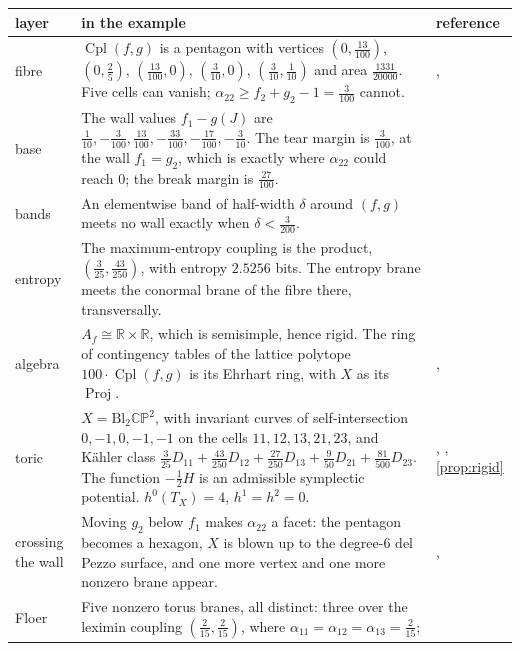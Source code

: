 \documentclass[11pt]{article}
\theoremstyle{definition}
\theoremstyle{remark}
\newcommand{\R}{\mathbb{R}}
\newcommand{\Cpl}{\operatorname{Cpl}}
\newcommand{\CP}{\mathbb{CP}}
\begin{document}
\begin{center}
\small
\begin{longtable}{p{2.6cm}p{8.3cm}p{3.8cm}}
\toprule
layer & in the example & reference\\
\midrule
\endhead
fibre & $\Cpl(f,g)$ is a pentagon with vertices $(0,\frac{13}{100})$, $(0,\frac25)$, $(\frac{13}{100},0)$, $(\frac3{10},0)$, $(\frac3{10},\frac1{10})$ and area
$\frac{1331}{20000}$. Five cells can vanish; $\alpha_{22}\ge f_2+g_2-1=\frac3{100}$ cannot. & \cite[\S6]{Conditionals}, \cite[Prop.~8.1]{Bridges}\\
base & The wall values $f_1-g(J)$ are $\frac1{10},-\frac3{100},\frac{13}{100},-\frac{33}{100},-\frac{17}{100},-\frac3{10}$. The tear margin is $\frac3{100}$, at the wall
$f_1=g_2$, which is exactly where $\alpha_{22}$ could reach $0$; the break margin is $\frac{27}{100}$. & \cite[Thm.~3.2]{Bands}\\
bands & An elementwise band of half-width $\delta$ around $(f,g)$ meets no wall exactly when $\delta<\frac3{200}$. & \cite[Prop.~3.4]{Bands}\\
entropy & The maximum-entropy coupling is the product, $(\frac3{25},\frac{43}{250})$, with entropy $2.5256$ bits. The entropy brane meets the
conormal brane of the fibre there, transversally. & \cite[Thm.~3.1]{Bridges}\\
algebra & $A_f\cong\R\times\R$, which is semisimple, hence rigid. The ring of contingency tables of the lattice polytope $100\cdot\Cpl(f,g)$ is its
Ehrhart ring, with $X$ as its $\operatorname{Proj}$. & \cite[Thms.~2.2, 7.1]{Algebras}, \cite[Prop.~7.1]{Bridges}\\
toric & $X=\mathrm{Bl}_2\CP^2$, with invariant curves of self-intersection $0,-1,0,-1,-1$ on the cells $11,12,13,21,23$, and Kähler class
$\frac3{25}D_{11}+\frac{43}{250}D_{12}+\frac{27}{250}D_{13}+\frac9{50}D_{21}+\frac{81}{500}D_{23}$. The function $-\frac12H$ is an admissible symplectic potential.
$h^0(T_X)=4$, $h^1=h^2=0$. & \cite{Family}, \cite[Thm.~5.1]{Bridges}, \cref{prop:rigid}\\
crossing the wall & Moving $g_2$ below $f_1$ makes $\alpha_{22}$ a facet: the pentagon becomes a hexagon, $X$ is blown up to the degree-$6$ del Pezzo
surface, and one more vertex and one more nonzero brane appear. & \cite[Prop.~3.3]{Family}, \cite[Prop.~8.1, Thm.~8.2]{Bridges}\\
Floer & Five nonzero torus branes, all distinct: three over the leximin coupling $(\frac2{15},\frac2{15})$, where $\alpha_{11}=\alpha_{12}=\alpha_{13}=\frac2{15}$;

\end{longtable}
\end{center}
\end{document}
